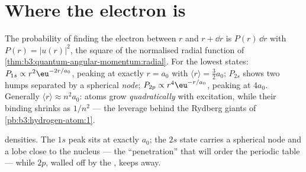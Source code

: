\section{Where the electron is}

\begin{proposition}\label{prop:b3:hydrogen-atom:radial}
The probability of finding the electron between $r$ and $r + \dd r$
is $P(r)\,\dd r$ with $P(r) = |u(r)|^2$, the square of the
normalised radial function of \cref{thm:b3:quantum-angular-momentum:radial}. For the lowest states:
$P_{1s} \propto r^2\eu^{-2r/a_0}$, peaking at exactly $r = a_0$ with
$\langle r\rangle = \tfrac32 a_0$; $P_{2s}$ shows two humps
separated by a spherical \emph{node}; $P_{2p} \propto
r^4\eu^{-r/a_0}$, peaking at $4a_0$. Generally $\langle r\rangle
\approx n^2a_0$: atoms grow \emph{quadratically} with excitation,
while their binding shrinks as $1/n^2$ --- the leverage behind the
Rydberg giants of \cref{pb:b3:hydrogen-atom:1}.
\end{proposition}
\admitted

\begin{omfigure}

{\small {} densities. The $1s$ peak sits at exactly
$a_0$; the $2s$ state carries a spherical node and a lobe close to
the nucleus --- the ``penetration'' that will order the periodic
table --- while $2p$, walled off by the , keeps
away.}
\end{omfigure}

